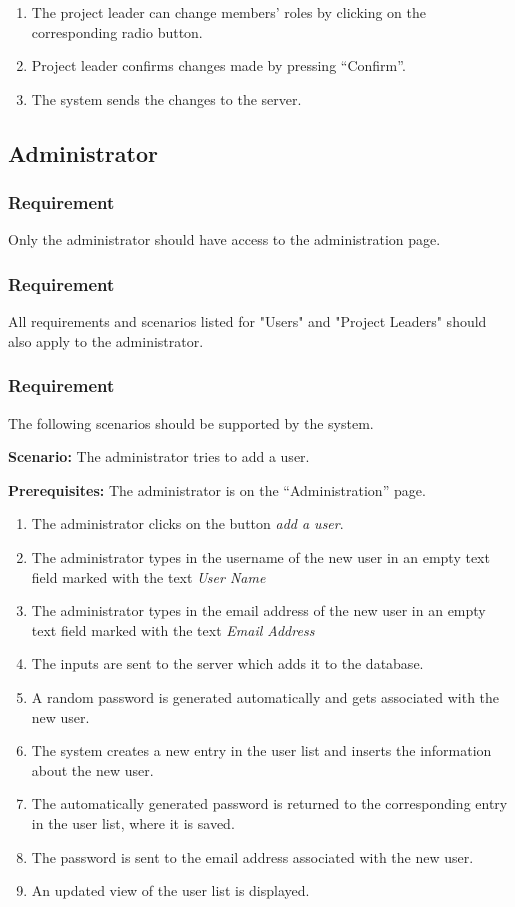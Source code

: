 \documentclass{article}
\begin{document}
\begin{enumerate}
    \item The project leader can change members' roles by clicking on the corresponding radio button.
    \item Project leader confirms changes made by pressing “Confirm”.
    \item The system sends the changes to the server.
    
\end{enumerate}


\subsection{Administrator}


\subsubsection{Requirement}
Only the administrator should have access to the administration page.

\subsubsection{Requirement}
All requirements and scenarios listed for "Users" and "Project Leaders" should also apply to the administrator.

\subsubsection{Requirement}
The following scenarios should be supported by the system.

\textbf{Scenario:} The administrator tries to add a user.

\textbf{Prerequisites:} The administrator is on the “Administration” page.

\begin{enumerate}
    \item The administrator clicks on the button \emph{add a user}.
    \item The administrator types in the username of the new user in an empty text field marked with the text \emph{User Name}
    \item The administrator types in the email address of the new user in an empty text field marked with the text \emph{Email Address}
    \item The inputs are sent to the server which adds it to the database.
    \item A random password is generated automatically and gets associated with the new user.
    \item The system creates a new entry in the user list and inserts the information about the new user.
    \item The automatically generated password is returned to the corresponding entry in the user list, where it is saved.
    \item The password is sent to the email address associated with the new user.
    \item An updated view of the user list is displayed.
\end{enumerate}
\end{document}

